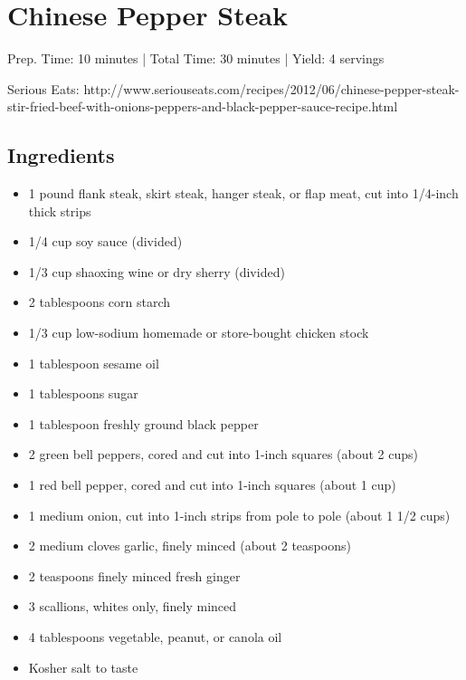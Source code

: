 \section{Chinese Pepper Steak}

\begin{center}
Prep. Time: 10 minutes |
Total Time: 30 minutes | 
Yield: 4 servings

\vspace{1em}

Serious Eats: http://www.seriouseats.com/recipes/2012/06/chinese-pepper-steak-stir-fried-beef-with-onions-peppers-and-black-pepper-sauce-recipe.html

\end{center}

\subsection{Ingredients}
\begin{multicols}{2}
\begin{itemize}
    \item 1 pound flank steak, skirt steak, hanger steak, or flap meat, cut into 1/4-inch thick strips
    \item 1/4 cup soy sauce (divided)
    \item 1/3 cup shaoxing wine or dry sherry (divided)
    \item 2 tablespoons corn starch
    \item 1/3 cup low-sodium homemade or store-bought chicken stock
    \item 1 tablespoon sesame oil
    \item 1 tablespoons sugar
    \item 1 tablespoon freshly ground black pepper
    \item 2 green bell peppers, cored and cut into 1-inch squares (about 2 cups)
    \item 1 red bell pepper, cored and cut into 1-inch squares (about 1 cup)
    \item 1 medium onion, cut into 1-inch strips from pole to pole (about 1 1/2 cups)
    \item 2 medium cloves garlic, finely minced (about 2 teaspoons)
    \item 2 teaspoons finely minced fresh ginger
    \item 3 scallions, whites only, finely minced
    \item 4 tablespoons vegetable, peanut, or canola oil
    \item Kosher salt to taste
\end{itemize}
\end{multicols}

